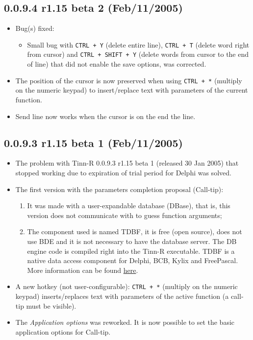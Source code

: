 \subsection*{0.0.9.4 r1.15 beta 2 (Feb/11/2005)}
\begin{itemize}
  \item Bug(s) fixed:
    \begin{itemize}
      \item Small bug with \texttt{CTRL + Y} (delete entire line),
        \texttt{CTRL + T} (delete word right from cursor) and \texttt{CTRL + SHIFT + Y}
        (delete words from cursor to the end of line) that did not enable the save options, was corrected.
    \end{itemize}
  \item The position of the cursor is now preserved when using \texttt{CTRL + *} (multiply on the numeric keypad)
    to insert/replace text with parameters of the current \RR{} function.
  \item Send line now works when the cursor is on the end the line.
\end{itemize}

\subsection*{0.0.9.3 r1.15 beta 1 (Feb/11/2005)}
\begin{itemize}
  \item The problem with Tinn-R 0.0.9.3 r1.15 beta 1 (released 30 Jan 2005) that stopped working due to expiration
    of trial period for Delphi was solved.
  \item The first version with the \RR{} parameters completion proposal (Call-tip):
    \begin{enumerate}
      \item It was made with a user-expandable database (DBase), that is, this version does not communicate with
        \RR{} to guess \RR{} function arguments;
      \item The component used is named TDBF, it is free (open source), does not use BDE and it is not necessary
        to have the database server. The DB engine code is compiled right into the Tinn-R executable.
        TDBF is a native data access component for Delphi, BCB, Kylix and FreePascal.
        More information can be found \href{https://sourceforge.net/projects/tdbf/}{here}.
    \end{enumerate}
  \item A new hotkey (not user-configurable): \texttt{CTRL + *} (multiply on the numeric keypad) inserts/replaces
    text with parameters of the active function (a call-tip must be visible).
  \item The \textit{Application options} was reworked. It is now possible to set the basic
    application options for \RR{} Call-tip.
\end{itemize}

